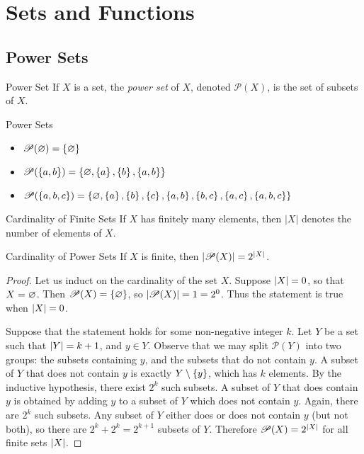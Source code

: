 \documentclass[class=article, crop=false]{standalone}
\begin{document}
  \section{Sets and Functions}
  \subsection{Power Sets}
  \begin{definition}{Power Set}
    If $X$ is a set, the \emph{power set} of $X$, denoted $\mathscr{P}(X)$, is the set of subsets of $X$.
  \end{definition}
  \begin{example}{Power Sets}
    \begin{itemize}
      \item $\mathscr{P}(\varnothing) = \left\{\varnothing\right\}$
      \item $\mathscr{P}(\left\{a, b\right\}) = \left\{\varnothing, \left\{a\right\}, \left\{b\right\}, \left\{a, b\right\}\right\}$
      \item $\mathscr{P}(\left\{a, b, c\right\}) = \left\{\varnothing, \left\{a\right\}, \left\{b\right\}, \left\{c\right\}, \left\{a, b\right\}, \left\{b, c\right\}, \left\{a, c\right\}, \left\{a, b, c\right\}\right\}$
    \end{itemize}
  \end{example}
  \begin{definition}{Cardinality of Finite Sets}
    If $X$ has finitely many elements, then $|X|$ denotes the number of elements of $X$.
  \end{definition}
  \begin{theorem}{Cardinality of Power Sets}
    If $X$ is finite, then $\left\lvert \mathscr{P}(X) \right\rvert = 2^{\left\lvert X \right\rvert}$.
  \end{theorem}
  \begin{proof}
    Let us induct on the cardinality of the set $X$. Suppose $\left\lvert X \right\rvert = 0$, so that $X = \varnothing$. Then $\mathscr{P}(X) = \left\{\varnothing\right\}$, so $\left\lvert \mathscr{P}(X) \right\rvert = 1 = 2^0$. Thus the statement is true when $\left\lvert X \right\rvert = 0$. \par
    Suppose that the statement holds for some non-negative integer $k$. Let $Y$ be a set such that $\left\lvert Y \right\rvert = k + 1$, and $y\in Y$. Observe that we may split $\mathscr{P}(Y)$ into two groups: the subsets containing $y$, and the subsets that do not contain $y$. A subset of $Y$ that does not contain $y$ is exactly $Y \setminus \left\{y\right\}$, which has $k$ elements. By the inductive hypothesis, there exist $2^k$ such subsets. A subset of $Y$ that does contain $y$ is obtained by adding $y$ to a subset of $Y$ which does not contain $y$. Again, there are $2^k$ such subsets. Any subset of $Y$ either does or does not contain $y$ (but not both), so there are $2^k + 2^k = 2^{k + 1}$ subsets of $Y$. Therefore $\mathscr{P}(X) = 2^{\left\lvert X \right\rvert}$ for all finite sets $\left\lvert X \right\rvert$.
  \end{proof}
\end{document}

